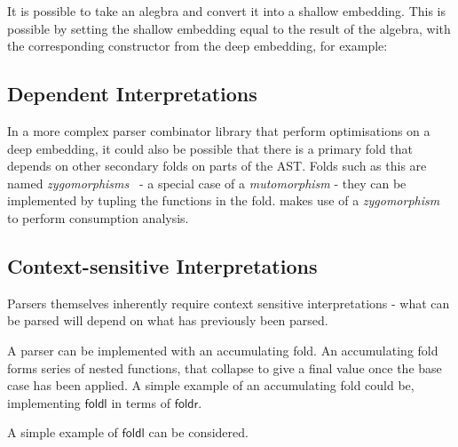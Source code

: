 \documentclass[a4paper, twocolumn, 10pt]{extarticle}
\newcommand\codeskip{\mskip\codemuskip}%
\let\codefont\textsf
\newcommand{\Conid}[1]{\mathit{#1}}
\newcommand{\Varid}[1]{\mathit{#1}}
\def\resethooks{%
  \global\let\SaveRestoreHook\empty
  \global\let\ColumnHook\empty}
\let\hspre\empty
\let\hspost\empty
\renewcommand\Varid[1]{\codefont{#1}}
\let\Conid\Varid
\begin{document}
It is possible to take an alegbra and convert it into a shallow embedding.
This is possible by setting the shallow embedding equal to the result of the algebra,
with the corresponding constructor from the deep embedding, for example:

\resethooks

\subsection{Dependent Interpretations}

In a more complex parser combinator library that perform optimisations on a deep embedding,
it could also be possible that there is a primary fold that depends on other secondary folds on parts of the AST.
Folds such as this are named \textit{zygomorphisms}~\cite{Fokkinga1989TuplingAM} - a special case of a \textit{mutomorphism} -
they can be implemented by tupling the functions in the fold.
\citet{parsley} makes use of a \textit{zygomorphism} to perform consumption analysis.


\subsection{Context-sensitive Interpretations}

Parsers themselves inherently require context sensitive interpretations - what can be parsed will
depend on what has previously been parsed.

A parser can be implemented with an accumulating fold.
An accumulating fold forms series of nested functions, that collapse to give a final value once the base case has been applied.
A simple example of an accumulating fold could be, implementing \ensuremath{\Varid{foldl}} in terms of \ensuremath{\Varid{foldr}}.

\resethooks
A simple example of \ensuremath{\Varid{foldl}} can be considered.
\end{document}
